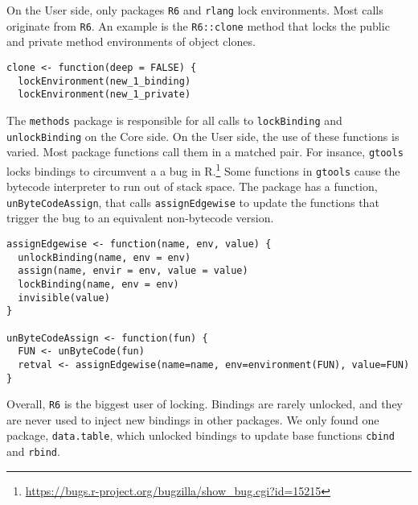 \documentclass[10pt,sigplan,authorversion=true]{acmart}
\renewcommand{\c}[1]{\lstinline |#1|\xspace}
\begin{document}
On the {User} side, only packages \c{R6} and \c{rlang} lock environments. Most
calls originate from \c{R6}. An example is the \c{R6::clone} method that locks
the public and private method environments of object clones.

\begin{lstlisting}
clone <- function(deep = FALSE) {
  lockEnvironment(new_1_binding)
  lockEnvironment(new_1_private)
\end{lstlisting}\medskip

The \c{methods} package is responsible for all calls to \c{lockBinding} and
\c{unlockBinding} on the {Core} side. On the {User} side, the use of these
functions is varied. Most package functions call them in a matched pair. For
insance, \c{gtools} locks bindings to circumvent a a bug in
R.\footnote{\url{https://bugs.r-project.org/bugzilla/show_bug.cgi?id=15215}}
Some functions in \c{gtools} cause the bytecode interpreter to run out of stack
space. The package has a function, \c{unByteCodeAssign}, that calls
\c{assignEdgewise} to update the functions that trigger the bug to an equivalent
non-bytecode version.

\begin{lstlisting}
assignEdgewise <- function(name, env, value) {
  unlockBinding(name, env = env)
  assign(name, envir = env, value = value)
  lockBinding(name, env = env)
  invisible(value)
}

unByteCodeAssign <- function(fun) {
  FUN <- unByteCode(fun)
  retval <- assignEdgewise(name=name, env=environment(FUN), value=FUN)
}
\end{lstlisting}\medskip

Overall, \c{R6} is the biggest user of locking. Bindings are rarely unlocked,
and they are never used to inject new bindings in other packages. We only found
one package, \c{data.table}, which unlocked bindings to update base functions
\c{cbind} and \c{rbind}.
\end{document}
